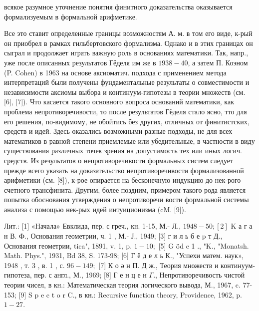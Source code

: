 \documentclass[10pt]{article}
\begin{document}
всякое разумное уточнение понятия финитного доказательства оказывается формализуемым в формальной арифметике.



Все это ставит определенные границы возможностям А. м. в том его виде, к-рый он приобрел в рамках гильбертовского формализма. Однако и в этих границах он сыграл и продолжает играть важную роль в основаниях математики. Так, напр., уже после описанных результатов Гёделя им же в $1938-40$, а затем П. Коэном (P. Cohen) в 1963 на основе аксиоматич. подхода с применением метода интерпретаций были получены фундаментальные результаты о совместимости и независимости аксиомы выбора и континуум-гипотезы в теории множеств (см. [6], [7]). Что касается такого основного вопроса оснований математики, как проблема непротиворечивости, то после результатов Гёделя стало ясно, тто для его решения, по-видимому, не обойтись без других, отличных от финитистских, средств и идей. Здесь оказались возможными разные подходы, не для всех математиков в равной степени приемлемые или убедительные, в частности в виду существования различных точек зрения на допустимость тех или иных логич. средств. Из результатов о непротиворечивости формальных систем следует прежде всего указать на доказательство непротиворечивости формализованной арифметики (см. [8]), к-рое опирается на бесконечную индукцию до нек-рого счетного трансфинита. Другим, более поздним, примером такого рода является попытка обоснования утверждения о непротиворечи вости формальной системы анализа с помощью нек-рых идей интуиционизма (cM. [9]).



Лит.: [1] «Начала» Евклида, пер. с греч., кн. 1-15, М.- Л., $1948-50 ;[2]$ K а $г$ а н В. Ф., Основания геометрии, ч. 1 , М.- Ј., 1949; [3] г и л ь б е p т Д., Основания геометрии, tica", 1891, v. 1, p. $1-10 ;$ [5] G öd e 1 ., "K., "Monatsh. Math. Phys.", 1931, Bd 38, S. 173-98; [6] Г ё д е л ь К., "Успехи матем. наук», 1948 , т. 3 , в. 1 , с. $96-149 ;$ [7] К о ә н П. Д ж., Теория множеств и континуум-гипотеза, пер. с англ., М., 1969; [8] Г е н ц е н $\Gamma$., Непротиворечивость чистой теории чисел, в кн.: Математическая теория логического вывода, М., 1967, c. 77-153; [9] S p e c t o r C., в кн.: Recursive function theory, Providence, 1962, p. $1-27$.
\end{document}
